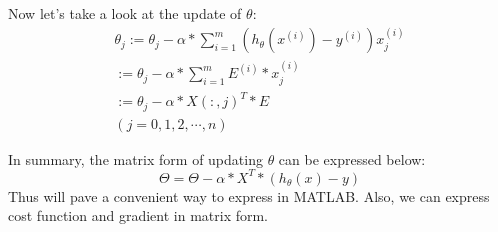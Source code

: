 \documentclass{article}
\begin{document}
Now let's take a look at the update of $\theta$:
\begin{eqnarray}
\theta_j := \theta_j - \alpha*\sum_{i=1}^{m}(h_\theta(x^{(i)})-y^{(i)})x_j^{(i)} \nonumber \\
:= \theta_j - \alpha * \sum_{i=1}^{m}E^{(i)}*x_j^{(i)} \nonumber\\
:= \theta_j - \alpha * X(:,j)^T * E \nonumber \\
(j = 0,1,2,\cdots,n)\nonumber
\end{eqnarray}

In summary, the matrix form of updating $\theta$ can be expressed below:
$$\Theta = \Theta - \alpha*X^T*(h_\theta(x)-y)$$
Thus will pave a convenient way to express in MATLAB. Also, we can express cost function and gradient in matrix form.
\end{document}
